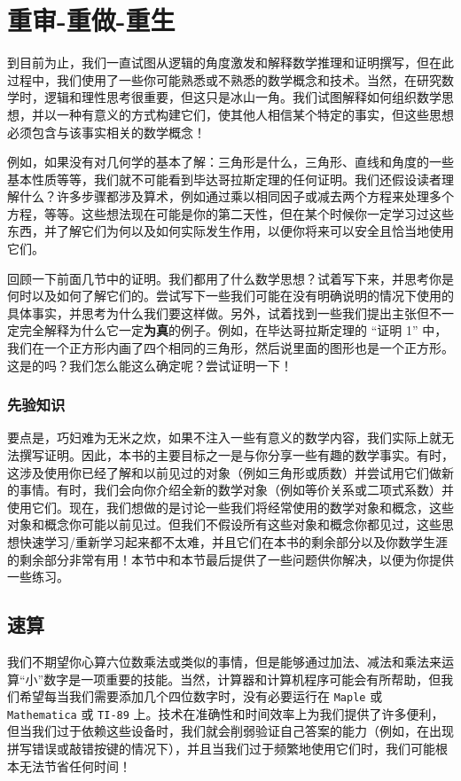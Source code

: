 \section{重审-重做-重生}\label{sec:section1.3}

到目前为止，我们一直试图从逻辑的角度激发和解释数学推理和证明撰写，但在此过程中，我们使用了一些你可能熟悉或不熟悉的数学概念和技术。当然，在研究数学时，逻辑和理性思考很重要，但这只是冰山一角。我们试图解释如何组织数学思想，并以一种有意义的方式构建它们，使其他人相信某个特定的事实，但这些思想必须包含与该事实相关的数学概念！

例如，如果没有对几何学的基本了解：三角形是什么，三角形、直线和角度的一些基本性质等等，我们就不可能看到毕达哥拉斯定理的任何证明。我们还假设读者理解什么？许多步骤都涉及算术，例如通过乘以相同因子或减去两个方程来处理多个方程，等等。这些想法现在可能是你的第二天性，但在某个时候你一定学习过这些东西，并了解它们为何以及如何实际发生作用，以便你将来可以安全且恰当地使用它们。

回顾一下前面几节中的证明。我们都用了什么数学思想？试着写下来，并思考你是何时以及如何了解它们的。尝试写下一些我们可能在没有明确说明的情况下使用的具体事实，并思考为什么我们要这样做。另外，试着找到一些我们提出主张但不一定完全解释为什么它一定\textbf{为真}的例子。例如，在毕达哥拉斯定理的 ``证明 1'' 中，我们在一个正方形内画了四个相同的三角形，然后说里面的图形也是一个正方形。这是的吗？我们怎么能这么确定呢？尝试证明一下！

\subsubsection*{先验知识}

要点是，巧妇难为无米之炊，如果不注入一些有意义的数学内容，我们实际上就无法撰写证明。因此，本书的主要目标之一是与你分享一些有趣的数学事实。有时，这涉及使用你已经了解和以前见过的对象（例如三角形或质数）并尝试用它们做新的事情。有时，我们会向你介绍全新的数学对象（例如等价关系或二项式系数）并使用它们。现在，我们想做的是讨论一些我们将经常使用的数学对象和概念，这些对象和概念你可能以前见过。但我们不假设所有这些对象和概念你都见过，这些思想快速学习/重新学习起来都不太难，并且它们在本书的剩余部分以及你数学生涯的剩余部分非常有用！本节中和本节最后提供了一些问题供你解决，以便为你提供一些练习。

\subsection{速算}

我们不期望你心算六位数乘法或类似的事情，但是能够通过加法、减法和乘法来运算``小''数字是一项重要的技能。当然，计算器和计算机程序可能会有所帮助，但我们希望每当我们需要添加几个四位数字时，没有必要运行在 \verb|Maple| 或 \verb|Mathematica| 或 \verb|TI-89| 上。技术在准确性和时间效率上为我们提供了许多便利，但当我们过于依赖这些设备时，我们就会削弱验证自己答案的能力（例如，在出现拼写错误或敲错按键的情况下），并且当我们过于频繁地使用它们时，我们可能根本无法节省任何时间！

